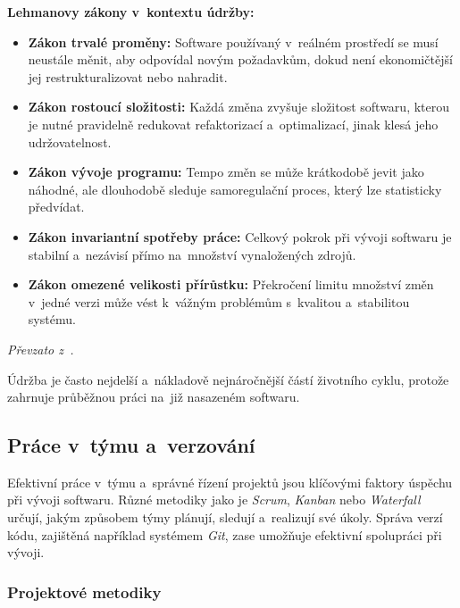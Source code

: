 \documentclass[male,czech,api_bc]{kitheses}
\begin{document}
\textbf{Lehmanovy zákony v~kontextu údržby:}
\begin{itemize}
	\item \textbf{Zákon trvalé proměny:} Software používaný v~reálném prostředí se musí neustále měnit, aby odpovídal novým požadavkům, dokud není ekonomičtější jej restrukturalizovat nebo nahradit.
	\item \textbf{Zákon rostoucí složitosti:} Každá změna zvyšuje složitost softwaru, kterou je nutné pravidelně redukovat refaktorizací a~optimalizací, jinak klesá jeho udržovatelnost.
	\item \textbf{Zákon vývoje programu:} Tempo změn se může krátkodobě jevit jako náhodné, ale dlouhodobě sleduje samoregulační proces, který lze statisticky předvídat.
	\item \textbf{Zákon invariantní spotřeby práce:} Celkový pokrok při vývoji softwaru je stabilní a~nezávisí přímo na~množství vynaložených zdrojů.
	\item \textbf{Zákon omezené velikosti přírůstku:} Překročení limitu množství změn v~jedné verzi může vést k~vážným problémům s~kvalitou a~stabilitou systému.
\end{itemize}
\noindent
\textit{Převzato z~\cite{legmanovyZakony}.}

Údržba je často nejdelší a~nákladově nejnáročnější částí životního cyklu, protože zahrnuje průběžnou práci na~již nasazeném softwaru.

\subsection{Práce v~týmu a~verzování}

Efektivní práce v~týmu a~správné řízení projektů jsou klíčovými faktory úspěchu při vývoji softwaru. Různé metodiky jako je \textit{Scrum}, \textit{Kanban} nebo \textit{Waterfall} určují, jakým způsobem týmy plánují, sledují a~realizují své úkoly. Správa verzí kódu, zajištěná například systémem \textit{Git}, zase umožňuje efektivní spolupráci při vývoji.

\newpage

\subsubsection{Projektové metodiky}
\end{document}
